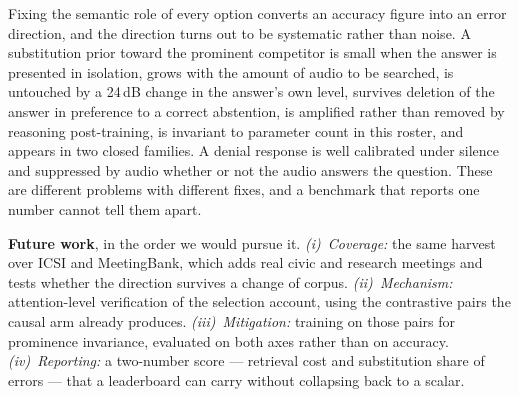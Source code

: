 \documentclass{article}
\newcommand{\plannedcorpus}{ICSI and MeetingBank}
\begin{document}
Fixing the semantic role of every option converts an accuracy figure into an
error direction, and the direction turns out to be systematic rather than
noise. A substitution prior toward the prominent competitor is small when the
answer is presented in isolation, grows with the amount of audio to be
searched, is untouched by a 24\,dB change in the answer's own level, survives
deletion of the answer in preference to a correct abstention, is amplified
rather than removed by reasoning post-training, is invariant to parameter
count in this roster, and appears in two closed families. A denial response
is well calibrated under silence and suppressed by audio whether or not the
audio answers the question. These are different problems with different
fixes, and a benchmark that reports one number cannot tell them apart.

\textbf{Future work}, in the order we would pursue it. \emph{(i)~Coverage:}
the same harvest over \plannedcorpus{}, which adds real civic and research
meetings and tests whether the direction survives a change of corpus.
\emph{(ii)~Mechanism:} attention-level verification of the selection account,
using the contrastive pairs the causal arm already produces.
\emph{(iii)~Mitigation:} training on those pairs for prominence invariance,
evaluated on both axes rather than on accuracy. \emph{(iv)~Reporting:} a
two-number score --- retrieval cost and substitution share of errors --- that
a leaderboard can carry without collapsing back to a scalar.
\end{document}
